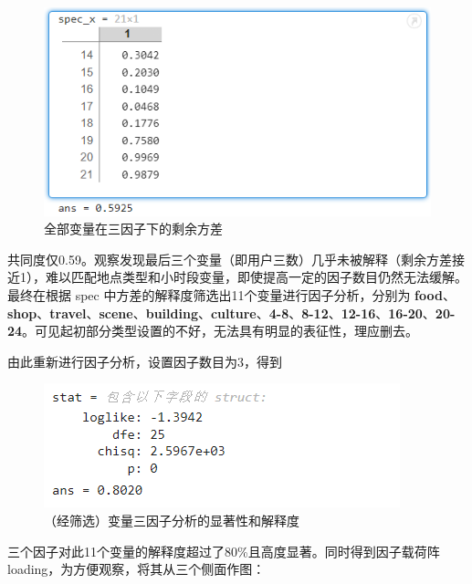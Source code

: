\documentclass[UTF8]{ctexart}
\begin{document}
		\begin{figure}[H]
			\centering
			\includegraphics{fac_x.png}
			\caption{全部变量在三因子下的剩余方差}
			\label{fac_x}
		\end{figure}
		
		共同度仅0.59。观察发现最后三个变量（即用户三数）几乎未被解释（剩余方差接近1），难以匹配地点类型和小时段变量，即使提高一定的因子数目仍然无法缓解。最终在根据 spec 中方差的解释度筛选出11个变量进行因子分析，分别为 \textbf{food}、\textbf{shop}、\textbf{travel}、\textbf{scene}、\textbf{building}、\textbf{culture}、\textbf{4-8}、\textbf{8-12}、\textbf{12-16}、\textbf{16-20}、\textbf{20-24}。可见起初部分类型设置的不好，无法具有明显的表征性，理应删去。
		
		由此重新进行因子分析，设置因子数目为3，得到
		
		\begin{figure}[H]
			\centering
			\includegraphics{fac_p.png}
			\caption{（经筛选）变量三因子分析的显著性和解释度}
			\label{fac_p}
		\end{figure}
		
		三个因子对此11个变量的解释度超过了80\%且高度显著。同时得到因子载荷阵 loading，为方便观察，将其从三个侧面作图：
		
\end{document}
